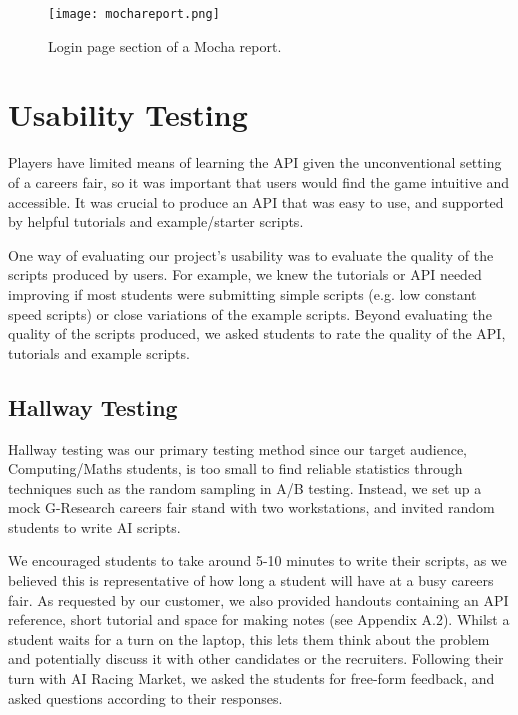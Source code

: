 \begin{figure}[H]
\centering
\texttt{[image: mochareport.png]}
\caption{Login page section of a Mocha report.}
\end{figure}

\section{Usability Testing}

Players have limited means of learning the API given the unconventional setting of a careers fair, so it was important that users would find the game intuitive and accessible. It was crucial to produce an API that was easy to use, and supported by helpful tutorials and example/starter scripts. 

One way of evaluating our project's usability was to evaluate the quality of the scripts produced by users. For example, we knew the tutorials or API needed improving if most students were submitting simple scripts (e.g. low constant speed scripts) or close variations of the example scripts. Beyond evaluating the quality of the scripts produced, we asked students to rate the quality of the API, tutorials and example scripts.

\subsection{Hallway Testing}

Hallway testing was our primary testing method since our target audience, Computing/Maths students, is too small to find reliable statistics through techniques such as the random sampling in A/B testing. Instead, we set up a mock G-Research careers fair stand with two workstations, and invited random students to write AI scripts.

We encouraged students to take around 5-10 minutes to write their scripts, as we believed this is representative of how long a student will have at a busy careers fair. As requested by our customer, we also provided handouts containing an API reference, short tutorial and space for making notes (see Appendix A.2). Whilst a student waits for a turn on the laptop, this lets them think about the problem and potentially discuss it with other candidates or the recruiters. Following their turn with AI Racing Market, we asked the students for free-form feedback, and asked questions according to their responses.

